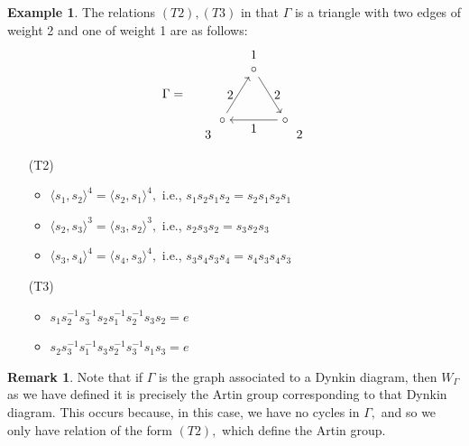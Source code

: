 \documentclass[11pt]{amsart}
\theoremstyle{definition}
\newtheorem{ex}[thm]{Example}
\newtheorem{rem}[thm]{Remark}
\begin{document}
\begin{ex}
The relations $(T2),(T3)$ in that $\Gamma$ is a triangle with two edges of weight 2 and one of weight 1 are as follows:
\[\Gamma = \begin{tikzpicture}[baseline=-0.5ex]
\matrix[matrix of math nodes,column sep={25pt,between origins},row
    sep={40pt,between origins},nodes={asymmetrical rectangle}] at (0,0)
  {
    && |[name = u]|\circ& \\
    &|[name=dl]| \circ & &|[name=dr]| \circ \\
  };
\draw[->]
   (u) to node[right] {2}(dr)
  ;
  \draw[->]
  (dl) to node[left]{2}(u)
  ;
  \draw[->]
  (dr) to node[below]{1}(dl)
  ;
  \node [yshift = .4 cm] at (u){1};
    \node [yshift = -.4 cm,xshift = .4 cm] at (dr){2};
    \node [yshift = -.4 cm,xshift = -.4 cm] at (dl){3};
   \end{tikzpicture}\]
   \begin{enumerate}
\item[(T2)]
\begin{itemize}
\item $\langle s_1,s_2 \rangle^4 = \langle s_2,s_1 \rangle^4,$ i.e., $s_1s_2s_1s_2 = s_2s_1s_2s_1$
\item $\langle s_2,s_3 \rangle^3 = \langle s_3,s_2 \rangle^3,$ i.e., $s_2s_3s_2 = s_3s_2s_3$
\item $\langle s_3,s_4 \rangle^4 = \langle s_4,s_3 \rangle^4,$ i.e., $s_3s_4s_3s_4 = s_4s_3s_4s_3$              
\end{itemize}
\item[(T3)]
\begin{itemize}
\item $s_1s_2^{-1}s_3^{-1}s_2s_1^{-1}s_2^{-1}s_3s_2 = e$

\item $s_2s_3^{-1}s_1^{-1}s_3s_2^{-1}s_3^{-1}s_1s_3 =e$

\end{itemize}
\end{enumerate}
\end{ex}



\begin{rem}
Note that if $\Gamma$ is the graph associated to a Dynkin diagram, then $W_\Gamma$ as we have defined it is precisely the Artin group corresponding to that Dynkin diagram. This occurs because, in this case, we have no cycles in $\Gamma,$ and so we only have relation of the form $(T2),$ which define the Artin group.
\end{rem}
\end{document}
